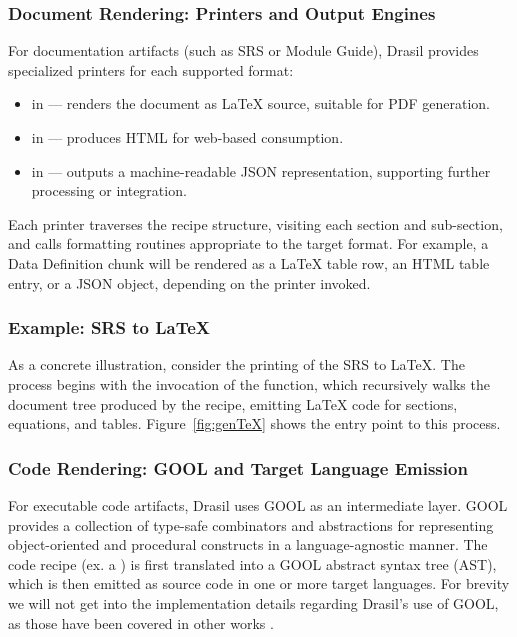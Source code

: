 \subsubsection{Document Rendering: Printers and Output Engines}
For documentation artifacts (such as SRS or Module Guide), Drasil provides 
specialized printers for each supported format:
\begin{itemize}
    \item {} in  --- renders the 
    document as \LaTeX{} source, suitable for PDF generation.
    \item {} in  --- produces 
    HTML for web-based consumption.
    \item {} in  --- outputs a 
    machine-readable JSON representation, supporting further processing or 
    integration.
\end{itemize}

Each printer traverses the recipe structure, visiting each section and 
sub-section, and calls formatting routines appropriate to the target format. 
For example, a Data Definition chunk will be rendered as a LaTeX table row, an 
HTML table entry, or a JSON object, depending on the printer invoked.
\subsubsection{Example: SRS to \LaTeX{}}
As a concrete illustration, consider the printing of the \gb{} SRS to 
\LaTeX{}. The process begins with the invocation of the  
function, which recursively walks the document tree produced by the recipe, 
emitting \LaTeX{} code for sections, equations, and tables. 
Figure~\ref{fig:genTeX} shows the entry point to this process.


\subsubsection{Code Rendering: GOOL and Target Language Emission}
For executable code artifacts, Drasil uses GOOL\cite{??} as an intermediate 
layer. GOOL provides a collection of type-safe combinators and abstractions for 
representing object-oriented and procedural constructs in a language-agnostic 
manner. The code recipe (ex. a ) is first translated into a 
GOOL abstract syntax tree (AST), which is then emitted as source code in one or 
more target languages. For brevity we will not get into the implementation 
details regarding Drasil's use of GOOL, as those have been covered in other 
works \cite{??} .

